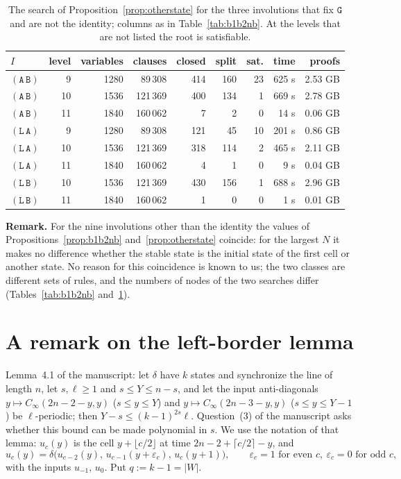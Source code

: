 \documentclass[11pt]{article}
\theoremstyle{remark}
\newcommand{\Lq}{\mathtt{L}}\newcommand{\Gq}{\mathtt{G}}\newcommand{\Aq}{\mathtt{A}}\newcommand{\Bq}{\mathtt{B}}\newcommand{\Fq}{\mathtt{F}}
\begin{document}
\begin{table}[ht]
\centering\small
\caption{The search of Proposition~\ref{prop:otherstate} for the three involutions that fix $\Gq$ and are not
the identity; columns as in Table~\ref{tab:b1b2nb}. At the levels that are not listed the root is
satisfiable.}\label{tab:otherstate}
\begin{tabular}{lrrrrrrrr}
\toprule
$I$ & level & variables & clauses & closed & split & sat. & time & proofs\\
\midrule
$(\Aq\,\Bq)$ & 9 & 1280 & 89\,308 & 414 & 160 & 23 & 625 s & 2.53 GB\\
$(\Aq\,\Bq)$ & 10 & 1536 & 121\,369 & 400 & 134 & 1 & 669 s & 2.78 GB\\
$(\Aq\,\Bq)$ & 11 & 1840 & 160\,062 & 7 & 2 & 0 & 14 s & 0.06 GB\\
$(\Lq\,\Aq)$ & 9 & 1280 & 89\,308 & 121 & 45 & 10 & 201 s & 0.86 GB\\
$(\Lq\,\Aq)$ & 10 & 1536 & 121\,369 & 318 & 114 & 2 & 465 s & 2.11 GB\\
$(\Lq\,\Aq)$ & 11 & 1840 & 160\,062 & 4 & 1 & 0 & 9 s & 0.04 GB\\
$(\Lq\,\Bq)$ & 10 & 1536 & 121\,369 & 430 & 156 & 1 & 688 s & 2.96 GB\\
$(\Lq\,\Bq)$ & 11 & 1840 & 160\,062 & 1 & 0 & 0 & 1 s & 0.01 GB\\
\bottomrule
\end{tabular}
\end{table}

\noindent\textbf{Remark.} For the nine involutions other than the identity the values of
Propositions~\ref{prop:b1b2nb} and~\ref{prop:otherstate} coincide: for the largest $N$ it makes no difference
whether the stable state is the initial state of the first cell or another state. No reason for this
coincidence is known to us; the two classes are different sets of rules, and the numbers of nodes of the two
searches differ (Tables~\ref{tab:b1b2nb} and~\ref{tab:otherstate}).

\section{A remark on the left-border lemma}\label{sec:leftborder}

Lemma~4.1 of the manuscript: let $\delta$ have $k$ states and synchronize the line of length $n$, let
$s,\ell\ge1$ and $s\le Y\le n-s$, and let the input anti-diagonals $y\mapsto C_\infty(2n-2-y,y)$
($s\le y\le Y$) and $y\mapsto C_\infty(2n-3-y,y)$ ($s\le y\le Y-1$) be $\ell$-periodic; then
$Y-s\le(k-1)^{2s}\ell$. Question~(3) of the manuscript asks whether this bound can be made polynomial in $s$.
We use the notation of that lemma: $u_c(y)$ is the cell $y+\lfloor c/2\rfloor$ at time
$2n-2+\lceil c/2\rceil-y$, and
\begin{equation}\label{eq:slices}
u_c(y)=\delta\bigl(u_{c-2}(y),\,u_{c-1}(y+\varepsilon_c),\,u_c(y+1)\bigr),\qquad
\varepsilon_c=1\text{ for even }c,\ \varepsilon_c=0\text{ for odd }c,
\end{equation}
with the inputs $u_{-1}$, $u_0$. Put $q:=k-1=|W|$.
\end{document}

